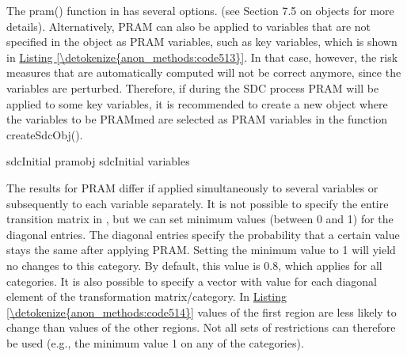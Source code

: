 \documentclass[letterpaper,10pt,english]{sphinxmanual}
\begin{document}
The pram() function in  has several options.  (see
Section 7.5 on  objects for more details). Alternatively, PRAM
can also be applied to variables that are not specified in the
 object as PRAM variables, such as key variables, which is
shown in \hyperref[\detokenize{anon_methods:code513}]{Listing \ref{\detokenize{anon_methods:code513}}}. In that case, however, the risk measures that are
automatically computed will not be correct anymore, since the variables
are perturbed. Therefore, if during the SDC process PRAM will be applied
to some key variables, it is recommended to create a new 
object where the variables to be PRAMmed are selected as PRAM variables
in the function createSdcObj().

\def\sphinxLiteralBlockLabel{\label{\detokenize{anon_methods:code513}}}
%
\begin{sphinxVerbatim}[commandchars=\\\{\},numbers=left,firstnumber=1,stepnumber=1]
 sdcInitial  pramobj  sdcInitial variables   
\end{sphinxVerbatim}

The results for PRAM differ if applied simultaneously to several
variables or subsequently to each variable separately. It is not
possible to specify the entire transition matrix in , but we
can set minimum values (between 0 and 1) for the diagonal entries. The
diagonal entries specify the probability that a certain value stays the
same after applying PRAM. Setting the minimum value to 1 will yield no
changes to this category. By default, this value is 0.8, which applies
for all categories. It is also possible to specify a vector with value
for each diagonal element of the transformation matrix/category. In
\hyperref[\detokenize{anon_methods:code514}]{Listing \ref{\detokenize{anon_methods:code514}}} values of the first region are less likely to change than
values of the other regions.  Not all sets of
restrictions can therefore be used (e.g., the minimum value 1 on any of
the categories).
\end{document}
